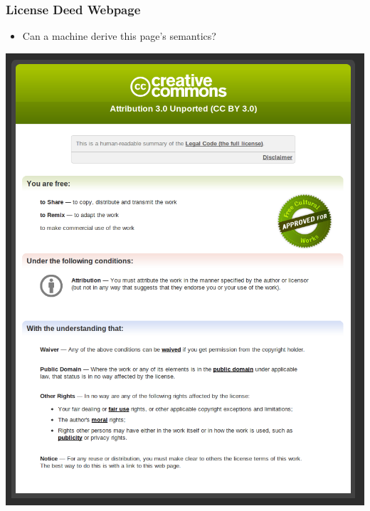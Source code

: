\documentclass[mathserif,xcolor=dvipsnames,handout]{beamer}
\begin{document}
\begin{frame}[t]
\frametitle{License Deed Webpage}
        \begin{itemize}
            \item Can a machine derive this page's semantics?
        \end{itemize}
        \begin{center}
            \includegraphics[height=0.8\textheight]{cc-deed-rendered-in-browser.png}
        \end{center}
\end{frame}
\end{document}
